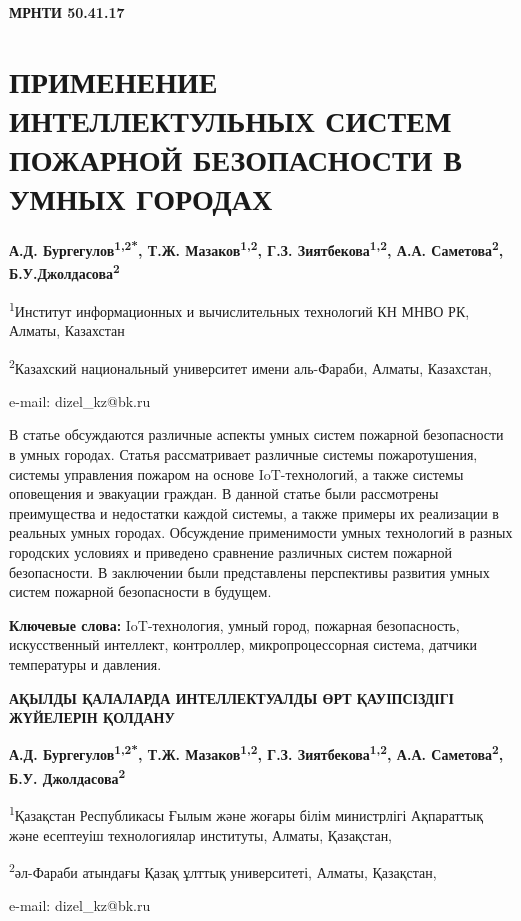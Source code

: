 {\bfseries МРНТИ 50.41.17}

\section{ПРИМЕНЕНИЕ ИНТЕЛЛЕКТУЛЬНЫХ СИСТЕМ ПОЖАРНОЙ БЕЗОПАСНОСТИ В УМНЫХ ГОРОДАХ}
\begin{center}
{\bfseries А.Д. Бургегулов\textsuperscript{1,2*}, Т.Ж.
Мазаков\textsuperscript{1,2}, Г.З. Зиятбекова\textsuperscript{1,2}, А.А.
Саметова\textsuperscript{2}, Б.У.Джолдасова\textsuperscript{2}}

\textsuperscript{1}Институт информационных и вычислительных технологий
КН МНВО РК, Алматы, Казахстан

\textsuperscript{2}Казахский национальный университет имени аль-Фараби,
Алматы, Казахстан,

e-mail: dizel\_kz@bk.ru
\end{center}

В статье обсуждаются различные аспекты умных систем пожарной
безопасности в умных городах. Статья рассматривает различные системы
пожаротушения, системы управления пожаром на основе IoT-технологий, а
также системы оповещения и эвакуации граждан. В данной статье были
рассмотрены преимущества и недостатки каждой системы, а также примеры их
реализации в реальных умных городах. Обсуждение применимости умных
технологий в разных городских условиях и приведено сравнение различных
систем пожарной безопасности. В заключении были представлены перспективы
развития умных систем пожарной безопасности в будущем.

{\bfseries Ключевые слова:} IoT-технология, умный город, пожарная
безопасность, искусственный интеллект, контроллер, микропроцессорная
система, датчики температуры и давления.

\begin{center}
{\large\bfseries АҚЫЛДЫ ҚАЛАЛАРДА ИНТЕЛЛЕКТУАЛДЫ ӨРТ ҚАУІПСІЗДІГІ ЖҮЙЕЛЕРІН
ҚОЛДАНУ}

{\bfseries А.Д. Бургегулов\textsuperscript{1,2*}, Т.Ж.
Мазаков\textsuperscript{1,2}, Г.З. Зиятбекова\textsuperscript{1,2}, А.А.
Саметова\textsuperscript{2}, Б.У. Джолдасова\textsuperscript{2}}

\textsuperscript{1}Қазақстан Республикасы Ғылым және жоғары білім
министрлігі Ақпараттық және есептеуіш технологиялар институты, Алматы,
Қазақстан,

\textsuperscript{2}әл-Фараби атындағы Қазақ ұлттық университеті, Алматы,
Қазақстан,

e-mail: dizel\_kz@bk.ru
\end{center}

